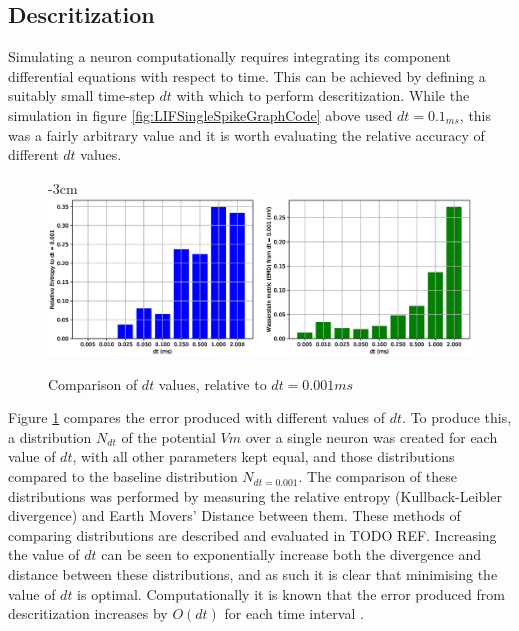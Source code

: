 \subsection{Descritization}

Simulating a neuron computationally requires integrating its component
differential equations with respect to time. This can be achieved by defining a
suitably small time-step $dt$ with which to perform descritization. While the
simulation in figure \ref{fig:LIFSingleSpikeGraphCode} above used $dt = 0.1_{ms}$,
this was a fairly arbitrary value and it is worth evaluating the relative
accuracy of different $dt$ values. 

\begin{figure}[h!]
    \centering
    \addtolength{\leftskip} {-3cm}
    \addtolength{\rightskip}{-3cm}
    \includegraphics[width=1.4\linewidth]{figures/graphs/entropyofdt.eps}
    \caption{Comparison of $dt$ values, relative to $dt=0.001ms$}
    \label{fig:entropyofdt}
\end{figure}

\FloatBarrier

Figure \ref{fig:entropyofdt} compares the
error produced with different values of $dt$. To
produce this, a distribution $N_{dt}$ of the potential $Vm$ over a single neuron
was created for each value of $dt$, with all other parameters kept equal, and
those distributions compared to the baseline distribution $N_{dt=0.001}$. The
comparison of these distributions was performed by measuring the relative
entropy (Kullback-Leibler divergence) and Earth Movers' Distance between them.
These methods of comparing distributions are described and evaluated in TODO
REF. Increasing the value of $dt$ can be seen to exponentially increase both the
divergence and distance between these distributions, and as such it is clear
that minimising the value of $dt$ is optimal. Computationally it is known that
the error produced from descritization increases by $O(dt)$ for each time
interval \autocite{brette_simulation_2007}.

